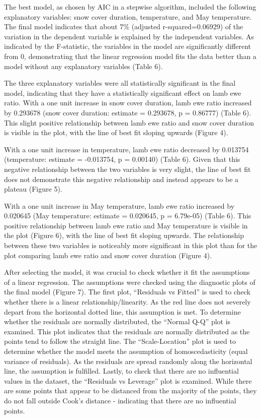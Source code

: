 \documentclass[
  12pt,
]{article}
\begin{document}
The best model, as chosen by AIC in a stepwise algorithm, included the
following explanatory variables: snow cover duration, temperature, and
May temperature. The final model indicates that about 7\% (adjusted
r-squared=0.06929) of the variation in the dependent variable is
explained by the independent variables. As indicated by the F-statistic,
the variables in the model are significantly different from 0,
demonstrating that the linear regression model fits the data better than
a model without any explanatory variables (Table 6).

The three explanatory variables were all statistically significant in
the final model, indicating that they have a statistically significant
effect on lamb ewe ratio. With a one unit increase in snow cover
duration, lamb ewe ratio increased by 0.293678 (snow cover duration:
estimate = 0.293678, p = 0.86777) (Table 6). This slight positive
relationship between lamb ewe ratio and snow cover duration is visible
in the plot, with the line of best fit sloping upwards (Figure 4).

With a one unit increase in temperature, lamb ewe ratio decreased by
0.013754 (temperature: estimate = -0.013754, p = 0.00140) (Table 6).
Given that this negative relationship between the two variables is very
slight, the line of best fit does not demonstrate this negative
relationship and instead appears to be a plateau (Figure 5).

With a one unit increase in May temperature, lamb ewe ratio increased by
0.020645 (May temperature: estimate = 0.020645, p = 6.79e-05) (Table 6).
This positive relationship between lamb ewe ratio and May temperature is
visible in the plot (Figure 6), with the line of best fit sloping
upwards. The relationship between these two variables is noticeably more
significant in this plot than for the plot comparing lamb ewe ratio and
snow cover duration (Figure 4).

After selecting the model, it was crucial to check whether it fit the
assumptions of a linear regression. The assumptions were checked using
the diagnostic plots of the final model (Figure 7). The first plot,
``Residuals vs Fitted'' is used to check whether there is a linear
relationship/linearity. As the red line does not severely depart from
the horizontal dotted line, this assumption is met. To determine whether
the residuals are normally distributed, the ``Normal Q-Q'' plot is
examined. This plot indicates that the residuals are normally
distributed as the points tend to follow the straight line. The
``Scale-Location'' plot is used to determine whether the model meets the
assumption of homoscedasticity (equal variance of residuals). As the
residuals are spread randomly along the horizontal line, the assumption
is fulfilled. Lastly, to check that there are no influential values in
the dataset, the ``Residuals vs Leverage'' plot is examined. While there
are some points that appear to be distanced from the majority of the
points, they do not fall outside Cook's distance - indicating that there
are no influential points.
\end{document}
